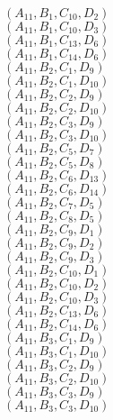 \documentclass[14pt]{article}
\begin{document}
    $({A}_{11}, {B}_{1}, {C}_{10}, {D}_{2}) $ \\ 
    $({A}_{11}, {B}_{1}, {C}_{10}, {D}_{3}) $ \\ 
    $({A}_{11}, {B}_{1}, {C}_{13}, {D}_{6}) $ \\ 
    $({A}_{11}, {B}_{1}, {C}_{14}, {D}_{6}) $ \\ 
    $({A}_{11}, {B}_{2}, {C}_{1}, {D}_{9}) $ \\ 
    $({A}_{11}, {B}_{2}, {C}_{1}, {D}_{10}) $ \\ 
    $({A}_{11}, {B}_{2}, {C}_{2}, {D}_{9}) $ \\ 
    $({A}_{11}, {B}_{2}, {C}_{2}, {D}_{10}) $ \\ 
    $({A}_{11}, {B}_{2}, {C}_{3}, {D}_{9}) $ \\ 
    $({A}_{11}, {B}_{2}, {C}_{3}, {D}_{10}) $ \\ 
    $({A}_{11}, {B}_{2}, {C}_{5}, {D}_{7}) $ \\ 
    $({A}_{11}, {B}_{2}, {C}_{5}, {D}_{8}) $ \\ 
    $({A}_{11}, {B}_{2}, {C}_{6}, {D}_{13}) $ \\ 
    $({A}_{11}, {B}_{2}, {C}_{6}, {D}_{14}) $ \\ 
    $({A}_{11}, {B}_{2}, {C}_{7}, {D}_{5}) $ \\ 
    $({A}_{11}, {B}_{2}, {C}_{8}, {D}_{5}) $ \\ 
    $({A}_{11}, {B}_{2}, {C}_{9}, {D}_{1}) $ \\ 
    $({A}_{11}, {B}_{2}, {C}_{9}, {D}_{2}) $ \\ 
    $({A}_{11}, {B}_{2}, {C}_{9}, {D}_{3}) $ \\ 
    $({A}_{11}, {B}_{2}, {C}_{10}, {D}_{1}) $ \\ 
    $({A}_{11}, {B}_{2}, {C}_{10}, {D}_{2}) $ \\ 
    $({A}_{11}, {B}_{2}, {C}_{10}, {D}_{3}) $ \\ 
    $({A}_{11}, {B}_{2}, {C}_{13}, {D}_{6}) $ \\ 
    $({A}_{11}, {B}_{2}, {C}_{14}, {D}_{6}) $ \\ 
    $({A}_{11}, {B}_{3}, {C}_{1}, {D}_{9}) $ \\ 
    $({A}_{11}, {B}_{3}, {C}_{1}, {D}_{10}) $ \\ 
    $({A}_{11}, {B}_{3}, {C}_{2}, {D}_{9}) $ \\ 
    $({A}_{11}, {B}_{3}, {C}_{2}, {D}_{10}) $ \\ 
    $({A}_{11}, {B}_{3}, {C}_{3}, {D}_{9}) $ \\ 
    $({A}_{11}, {B}_{3}, {C}_{3}, {D}_{10}) $ \\ 
\end{document}
